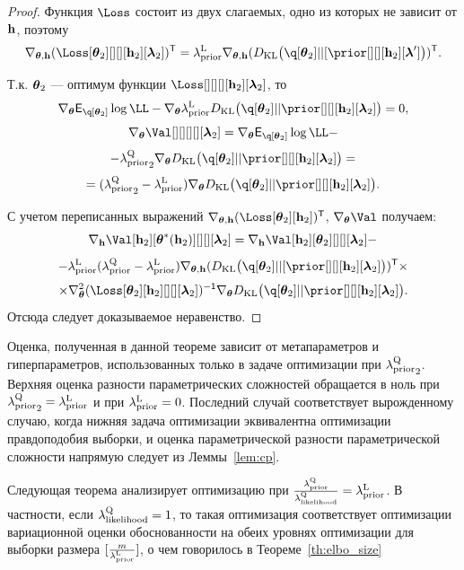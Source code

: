 \begin{proof}
Функция $\Loss$ состоит из двух слагаемых, одно из которых не зависит от $\mathbf{h}$, поэтому
\[
    \nabla_{\teta, \h} (\Loss[\teta_2][][][\h_2][\lam_2])^\mathsf{T}  = \lamCL \nabla_{\teta, \h} (\KL{\q[\teta_2]}{[\prior[][][\h_2][\lam']})^\mathsf{T}.
\]

Т.к. $\boldsymbol{\theta}_2$ --- оптимум функции $\Loss[][][][\h_2][\lam_2]$, то 
$$ 
\nabla_{\teta} \E_{\q[\teta_2]} \log \LL - \nabla_{\teta} \lamCL \KL{\q[\teta_2]}{\prior[][][\h_2][\lam_2]} = 0,
$$
$$ 
\nabla_{\teta} \Val[][][][][\lam_2] =\nabla_{\teta} \E_{\q[\teta_2]} \log \LL -
$$
\[
- {\lamCQ}_2  \nabla_{\teta} \KL{\q[\teta_2]}{\prior[][][\h_2][\lam_2]} = 
\]
$$
   = ({\lamCQ}_2 - \lamCL)\nabla_{\teta} \KL{\q[\teta_2]}{\prior[][][\h_2][\lam_2]}.
$$

С учетом переписанных выражений $\nabla_{\teta, \h} (\Loss[\teta_2][\h_2])^\mathsf{T}$, $\nabla_{\teta} \Val$ получаем:
\[
     \nabla_{\h} \Val[\h_2][\teta^{*}(\h_2)][][][\lam_2]  = \nabla_{\h} \Val[\h_2][\teta_2][][][\lam_2] -
\]
\[
    -  \lamCL (\lamCQ - \lamCL)\nabla_{\teta, \h} (\KL{\q[\teta_2]}{[\prior[][][\h_2][\lam_2]})^\mathsf{T}  \times 
\]
\[
\times  \nabla_{\teta}^2(\Loss[\teta_2][\h_2][][][\lam_2])^\mathsf{-1} \nabla_{\teta} \KL{\q[\teta_2]}{\prior[][][\h_2][\lam_2]}.
\]
Отсюда следует доказываемое неравенство.
\end{proof}
Оценка, полученная в данной теореме зависит от метапараметров и гиперпараметров, использованных только в задаче оптимизации при ${\lambda_\text{prior}^\text{Q}}_2$. Верхняя оценка разности параметрических сложностей обращается в ноль при ${\lambda_\text{prior}^\text{Q}}_2 = \lambda_\text{prior}^\text{L}$ и при $\lambda_\text{prior}^\text{L} = 0$. Последний случай соответствует вырожденному случаю, когда нижняя задача оптимизации эквивалентна оптимизации правдоподобия выборки, и оценка параметрической разности параметрической сложности напрямую следует из Леммы~\ref{lem:cp}.

Следующая теорема анализирует оптимизацию при  $\frac{\lambda_\text{prior}^\text{Q}}{\lambda_\text{likelihood}^\text{Q}} = \lambda_\text{prior}^\text{L}$. В частности, если $\lambda_\text{likelihood}^\text{Q} = 1$, то такая оптимизация соответствует оптимизации вариационной оценки обоснованности на обеих уровнях оптимизации для выборки размера $[\frac{m}{\lambda_\text{prior}^\text{L}}]$, о чем говорилось в Теореме~\ref{th:elbo_size}

